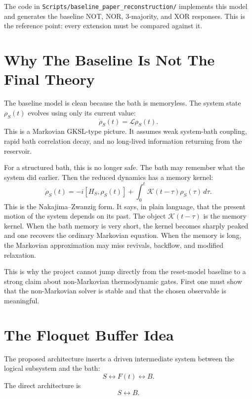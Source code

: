 \documentclass[11pt]{article}
\begin{document}
The code in \texttt{Scripts/baseline\_paper\_reconstruction/} implements this model and
generates the baseline NOT, NOR, 3-majority, and XOR responses.  This is the reference point:
every extension must be compared against it.

\section{Why The Baseline Is Not The Final Theory}

The baseline model is clean because the bath is memoryless.  The system state $\rho_S(t)$
evolves using only its current value:
\begin{equation}
    \dot{\rho}_S(t)
    =
    \mathcal{L}\rho_S(t).
\end{equation}
This is a Markovian GKSL-type picture.  It assumes weak system-bath coupling, rapid bath
correlation decay, and no long-lived information returning from the reservoir.

For a structured bath, this is no longer safe.  The bath may remember what the system did
earlier.  Then the reduced dynamics has a memory kernel:
\begin{equation}
    \dot{\rho}_S(t)
    =
    -i[H_S,\rho_S(t)]
    +
    \int_0^t
    \mathcal{K}(t-\tau)\rho_S(\tau)\,d\tau.
\end{equation}
This is the Nakajima--Zwanzig form.  It says, in plain language, that the present motion of the
system depends on its past.  The object $\mathcal{K}(t-\tau)$ is the memory kernel.  When
the bath memory is very short, the kernel becomes sharply peaked and one recovers the
ordinary Markovian equation.  When the memory is long, the Markovian approximation may
miss revivals, backflow, and modified relaxation.

This is why the project cannot jump directly from the reset-model baseline to a strong claim
about non-Markovian thermodynamic gates.  First one must show that the non-Markovian
solver is stable and that the chosen observable is meaningful.

\section{The Floquet Buffer Idea}

The proposed architecture inserts a driven intermediate system between the logical subsystem
and the bath:
\begin{equation}
    S \longleftrightarrow F(t) \longleftrightarrow B.
\end{equation}
The direct architecture is
\begin{equation}
    S \longleftrightarrow B.
\end{equation}
\end{document}
